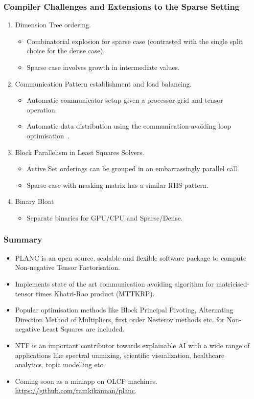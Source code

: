 \documentclass{beamer}
\begin{document}
\begin{frame}
\frametitle{Compiler Challenges and Extensions to the Sparse Setting}
\begin{enumerate}
\item Dimension Tree ordering.
	\begin{itemize}
	\item Combinatorial explosion for sparse case (contrasted with the single split choice for the dense case).
	\item Sparse case involves growth in intermediate values.
	\end{itemize}
\item Communication Pattern establishment and load balancing.
	\begin{itemize}
	\item Automatic communicator setup given a processor grid and tensor operation.
	\item Automatic data distribution using the communication-avoiding loop optimisation~\cite{knight2015communication, DR16arxiv}.
	\end{itemize}
\item Block Parallelism in Least Squares Solvers.
	\begin{itemize}
	\item Active Set orderings can be grouped in an embarrassingly parallel call.
	\item Sparse case with masking matrix has a similar RHS pattern.
	\end{itemize}
\item Binary Bloat
	\begin{itemize}
	\item Separate binaries for GPU/CPU and Sparse/Dense.
	\end{itemize}
\end{enumerate}
\end{frame}

\begin{frame}[label=summary]
\frametitle{Summary}
\begin{itemize}
\item PLANC is an open source, scalable and flexible software package to compute Non-negative Tensor Factorisation.
\item Implements state of the art communication avoiding algorithm for matricised-tensor times Khatri-Rao product (MTTKRP).
\item Popular optimisation methods like Block Principal Pivoting, Alternating Direction Method of Multipliers, first order Nesterov methods etc. for Non-negative Least Squares are included. 
\item NTF is an important contributor towards explainable AI with a wide range of applications like spectral unmixing, scientific visualization, healthcare analytics, topic modelling etc.
\item Coming soon as a miniapp on OLCF machines. \href{https://github.com/ramkikannan/planc/}{https://github.com/ramkikannan/planc}.
\end{itemize}
\end{frame}
\end{document}
